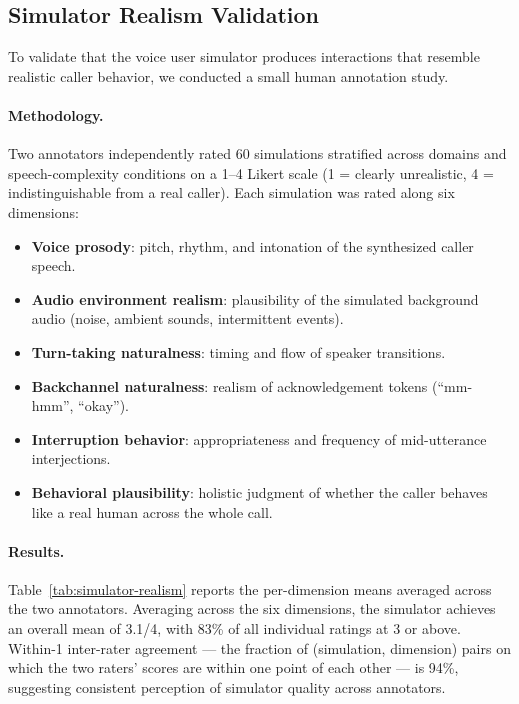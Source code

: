\subsection{Simulator Realism Validation}\label{app:simulator-realism}

To validate that the voice user simulator produces interactions that resemble realistic caller behavior, we conducted a small human annotation study.%

\paragraph{Methodology.} Two annotators independently rated 60 simulations stratified across domains and speech-complexity conditions on a 1--4 Likert scale (1 = clearly unrealistic, 4 = indistinguishable from a real caller). Each simulation was rated along six dimensions:%

\begin{itemize}[nosep,leftmargin=*]
    \item \textbf{Voice prosody}: pitch, rhythm, and intonation of the synthesized caller speech.
    \item \textbf{Audio environment realism}: plausibility of the simulated background audio (noise, ambient sounds, intermittent events).
    \item \textbf{Turn-taking naturalness}: timing and flow of speaker transitions.
    \item \textbf{Backchannel naturalness}: realism of acknowledgement tokens (``mm-hmm'', ``okay'').
    \item \textbf{Interruption behavior}: appropriateness and frequency of mid-utterance interjections.
    \item \textbf{Behavioral plausibility}: holistic judgment of whether the caller behaves like a real human across the whole call.
\end{itemize}%
%

\paragraph{Results.} Table~\ref{tab:simulator-realism} reports the per-dimension means averaged across the two annotators. Averaging across the six dimensions, the simulator achieves an overall mean of 3.1/4, with 83\% of all individual ratings at 3 or above. Within-1 inter-rater agreement --- the fraction of (simulation, dimension) pairs on which the two raters' scores are within one point of each other --- is 94\%, suggesting consistent perception of simulator quality across annotators.%

